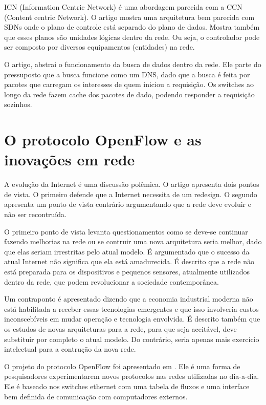 ICN (Information Centric Network) \citep{bong2009information} é uma abordagem 
parecida com a CCN (Content centric Network). 
O artigo mostra uma arquitetura bem parecida com SDNs onde o plano de controle 
está separado do plano de dados. Mostra também que esses planos são unidades 
lógicas dentro da rede. Ou seja, o controlador pode ser composto por diversos 
equipamentos (entidades) na rede. 

O artigo, abstrai o funcionamento da busca de dados dentro da rede. 
Ele parte do pressuposto que a busca funcione como um DNS, dado que a busca é 
feita por pacotes que carregam os interesses de quem iniciou a requisição. 
Os switches ao longo da rede fazem cache dos pacotes de dado, podendo 
responder a requisição sozinhos. 

\section{O protocolo OpenFlow e as inovações em rede}

A evolução da Internet é uma discussão polêmica. 
O artigo \citep{jennifer2010future} apresenta dois pontos de vista.
O primeiro defende que a Internet necessita de um redesign. 
O segundo apresenta um ponto de vista contrário argumentando que a rede 
deve evoluir e não ser recontruída.

O primeiro ponto de vista levanta questionamentos como se deve-se continuar
fazendo melhorias na rede ou se contruir uma nova arquitetura seria melhor, 
dado que elas seriam irrestritas pelo atual modelo. 
É argumentado que o sucesso da atual Internet não significa que 
ela está amadurecida. 
É descrito que a rede não está preparada para os dispositivos e 
pequenos sensores, atualmente utilizados dentro da rede, que podem 
revolucionar a sociedade contemporânea.

Um contraponto é apresentado dizendo que a economia industrial moderna não 
está habilitada a receber essas tecnologias emergentes e que isso involveria 
custos inconscebíveis em mudar operação e tecnologia envolvida. 
É descrito também que os estudos de novas arquiteturas para a rede, para que 
seja aceitável, deve substituir por completo o atual modelo. 
Do contrário, seria apenas mais exercício intelectual para a contrução 
da nova rede. 

O projeto do protocolo OpenFlow foi apresentado em \citep{nick2008openflow}. 
Ele é uma forma de pesquisadores experimentarem novos protocolos nas redes 
utilizadas no dia-a-dia. Ele é baseado nos switches ethernet com uma tabela de 
fluxos e uma interface bem definida de comunicação com computadores externos. 

